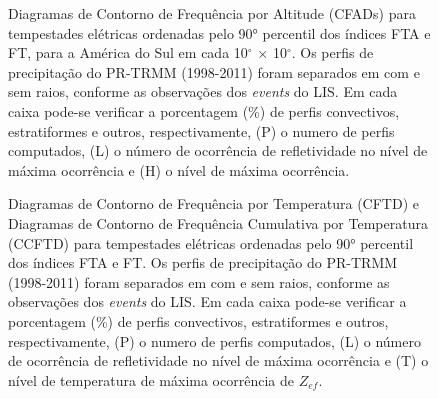 \begin{figure}
  \caption{Diagramas de Contorno de Frequência por Altitude (CFADs) para tempestades elétricas ordenadas pelo 90° percentil dos índices FTA e FT, para a América do Sul em cada 10$^{\circ}$  $\times$ 10$^{\circ}$. Os perfis de precipitação do PR-TRMM (1998-2011) foram separados em com e sem raios, conforme as observações dos \textit{events} do LIS. Em cada caixa pode-se verificar a porcentagem (\%) de perfis convectivos, estratiformes e outros, respectivamente, (P) o numero de perfis computados, (L) o número de ocorrência de refletividade no nível de máxima ocorrência e (H) o nível de máxima ocorrência. }
\label{cfads}
\end{figure} 


\begin{figure}
  \caption{Diagramas de Contorno de Frequência por Temperatura (CFTD) e Diagramas de Contorno de Frequência Cumulativa por Temperatura (CCFTD)  para tempestades elétricas ordenadas pelo 90° percentil dos índices FTA e FT. Os perfis de precipitação do PR-TRMM (1998-2011) foram separados em com e sem raios, conforme as observações dos \textit{events} do LIS. Em cada caixa pode-se verificar a porcentagem (\%) de perfis convectivos, estratiformes e outros, respectivamente, (P) o numero de perfis computados, (L) o número de ocorrência de refletividade no nível de máxima ocorrência e (T) o nível de temperatura de máxima ocorrência de $Z_{ef}$. }
\label{cftdccftd}
\end{figure} 

